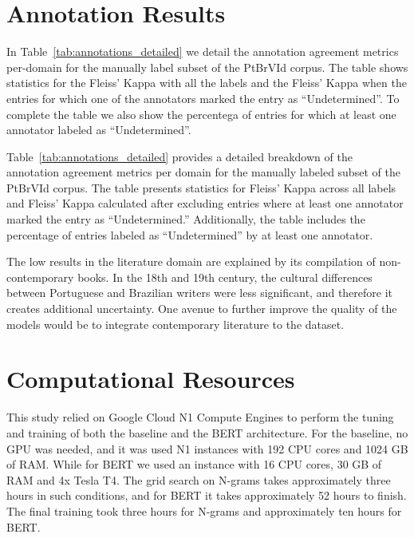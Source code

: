 

\section{Annotation Results}
\label{app:annotation}

In Table~\ref{tab:annotations_detailed} we detail the annotation agreement metrics per-domain for the manually label subset of the PtBrVId corpus. The table shows statistics for the Fleiss' Kappa with all the labels and the Fleiss' Kappa when the entries for which one of the annotators marked the entry as ``Undetermined''. To complete the table we also show the percentega of entries for which at least one annotator labeled as ``Undetermined''.  

Table~\ref{tab:annotations_detailed} provides a detailed breakdown of the annotation agreement metrics per domain for the manually labeled subset of the PtBrVId corpus. The table presents statistics for Fleiss' Kappa across all labels and Fleiss' Kappa calculated after excluding entries where at least one annotator marked the entry as ``Undetermined.'' Additionally, the table includes the percentage of entries labeled as ``Undetermined'' by at least one annotator.




The low results in the literature domain are explained by its compilation of non-contemporary books. In the 18th and 19th century, the cultural differences between Portuguese and Brazilian writers were less significant, and therefore it creates additional uncertainty. One avenue to further improve the quality of  the models would be to integrate contemporary literature to the dataset.

\section{Computational Resources}

This study relied on Google Cloud N1 Compute Engines to perform the tuning and training of both the baseline and the BERT architecture. For the baseline, no GPU was needed, and it was used N1 instances with 192 CPU cores and 1024 GB of RAM. While for BERT we used an instance with 16 CPU cores, 30 GB of RAM and 4x Tesla T4. The grid search on N-grams takes approximately three hours in such conditions, and for BERT it takes approximately 52 hours to finish. The final training took three hours for N-grams and approximately ten hours for BERT.  

